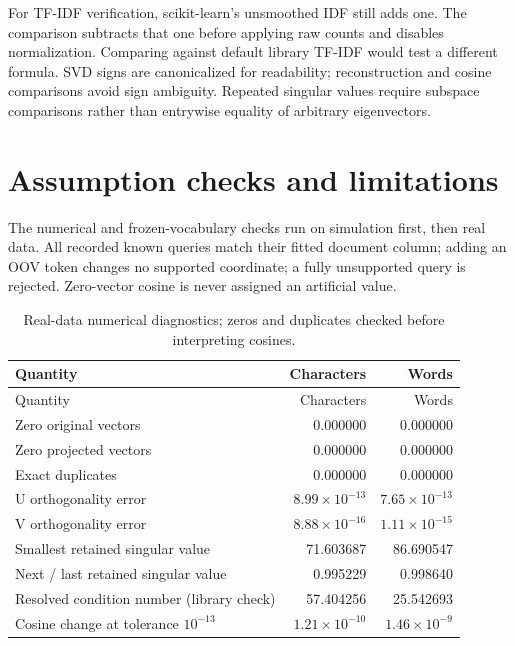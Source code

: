 \documentclass[11pt]{article}
\renewcommand{\arraystretch}{1.15}
\begin{document}
For TF-IDF verification, scikit-learn's unsmoothed IDF still adds one.
The comparison subtracts that one before applying raw counts and
disables normalization. Comparing against default library TF-IDF
would test a different formula. SVD signs are canonicalized for
readability; reconstruction and cosine comparisons avoid sign ambiguity.
Repeated singular values require subspace comparisons rather than
entrywise equality of arbitrary eigenvectors.

\section{Assumption checks and limitations}
The numerical and frozen-vocabulary checks run on simulation first,
then real data. All recorded known queries match their fitted document
column; adding an OOV token changes no supported coordinate; a fully
unsupported query is rejected. Zero-vector cosine is never assigned
an artificial value.
{\small\renewcommand{\arraystretch}{1.05}
\begin{longtable}{lrr}
\caption{Real-data numerical diagnostics; zeros and duplicates checked before interpreting cosines.}\\
\toprule
Quantity & Characters & Words \\ \midrule\endfirsthead
\toprule
Quantity & Characters & Words \\ \midrule\endhead
Zero original vectors & 0.000000 & 0.000000 \\
Zero projected vectors & 0.000000 & 0.000000 \\
Exact duplicates & 0.000000 & 0.000000 \\
U orthogonality error & $8.99\times10^{-13}$ & $7.65\times10^{-13}$ \\
V orthogonality error & $8.88\times10^{-16}$ & $1.11\times10^{-15}$ \\
Smallest retained singular value & 71.603687 & 86.690547 \\
Next / last retained singular value & 0.995229 & 0.998640 \\
Resolved condition number (library check) & 57.404256 & 25.542693 \\
Cosine change at tolerance $10^{-13}$ & $1.21\times10^{-10}$ & $1.46\times10^{-9}$ \\
\bottomrule
\end{longtable}
}
\end{document}
